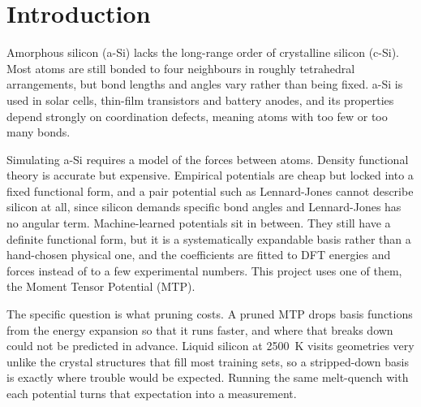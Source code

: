 \documentclass[11pt]{article}
\begin{document}
\thispagestyle{empty}
{\hypersetup{linkcolor=black}\tableofcontents}
\clearpage
{}
\setcounter{page}{1}

\section{Introduction}

Amorphous silicon (a-Si) lacks the long-range order of crystalline silicon (c-Si). Most atoms are still bonded to four neighbours in roughly tetrahedral arrangements, but bond lengths and angles vary rather than being fixed. a-Si is used in solar cells, thin-film transistors and battery anodes, and its properties depend strongly on coordination defects, meaning atoms with too few or too many bonds.

Simulating a-Si requires a model of the forces between atoms. Density functional theory is accurate but expensive. Empirical potentials are cheap but locked into a fixed functional form, and a pair potential such as Lennard-Jones cannot describe silicon at all, since silicon demands specific bond angles and Lennard-Jones has no angular term. Machine-learned potentials sit in between. They still have a definite functional form, but it is a systematically expandable basis rather than a hand-chosen physical one, and the coefficients are fitted to DFT energies and forces instead of to a few experimental numbers. This project uses one of them, the Moment Tensor Potential (MTP).

The specific question is what pruning costs. A pruned MTP drops basis functions from the energy expansion so that it runs faster, and where that breaks down could not be predicted in advance. Liquid silicon at 2500~K visits geometries very unlike the crystal structures that fill most training sets, so a stripped-down basis is exactly where trouble would be expected. Running the same melt-quench with each potential turns that expectation into a measurement.
\end{document}
